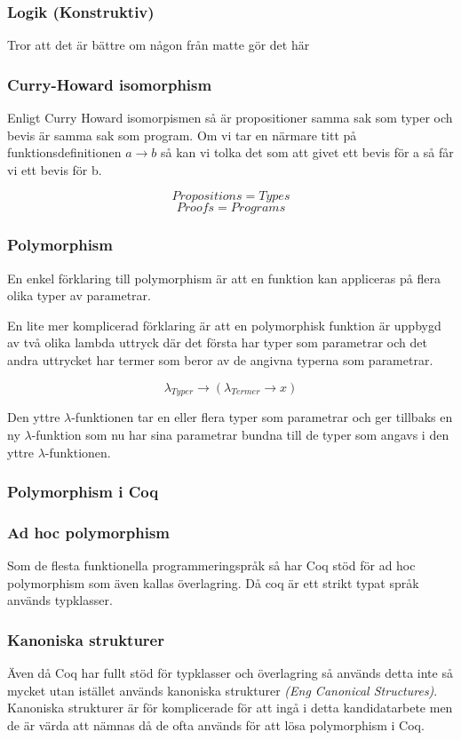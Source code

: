 \subsubsection{Logik (Konstruktiv)}
        Tror att det är bättre om någon från matte gör det här

\subsubsection{Curry-Howard isomorphism}

Enligt Curry Howard isomorpismen så är propositioner samma sak
som typer och bevis är samma sak som program.
Om vi tar en närmare titt på funktionsdefinitionen
$a \rightarrow b$ så kan vi tolka det som
att givet ett bevis för a så får vi ett bevis för b.

$$ Propositions = Types $$
$$ Proofs = Programs $$

\subsubsection{Polymorphism}
En enkel förklaring till polymorphism är att en funktion
kan appliceras på flera olika typer av parametrar.

En lite mer komplicerad förklaring är att en polymorphisk funktion är uppbygd av
två olika lambda uttryck där det första har typer som parametrar och det andra
uttrycket har termer som beror av de angivna typerna som parametrar.

\begin{equation}
\lambda_{Typer} \rightarrow (\lambda_{Termer} \rightarrow x)
\label{polymorphsk funktion}
\end{equation}

Den yttre $\lambda$-funktionen tar en eller flera typer som parametrar och
ger tillbaks en ny $\lambda$-funktion som nu har sina parametrar bundna till
de typer som angavs i den yttre $\lambda$-funktionen.

\subsubsection{Polymorphism i Coq}
\subsubsection{Ad hoc polymorphism}
Som de flesta funktionella programmeringspråk så har Coq stöd för ad hoc
polymorphism som även kallas överlagring. Då coq är ett strikt typat
språk används typklasser.
\subsubsection{Kanoniska strukturer}
Även då Coq har fullt stöd för typklasser och överlagring så används detta
inte så mycket utan istället används kanoniska strukturer
{\it (Eng Canonical Structures)}. Kanoniska strukturer är för komplicerade för
att ingå i detta kandidatarbete men de är värda att nämnas då de ofta används
för att lösa polymorphism i Coq.
